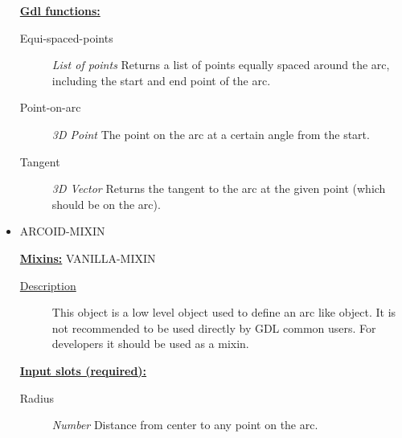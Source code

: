 \documentclass [11pt]{book}
\begin{document}
\begin{itemize}
\textbf{
\underline{Gdl functions:}}

\begin{description}

\item [Equi-spaced-points]
\emph{List of points} Returns a list of points equally spaced around the arc, including
the start and end point of the arc.


\item [Point-on-arc]
\emph{3D Point} The point on the arc at a certain angle from the start.


\item [Tangent]
\emph{3D Vector} Returns the tangent to the arc at the given point (which should be on the arc).


\end{description}







\item {}ARCOID-MIXIN


\textbf{
\underline{Mixins:}} VANILLA-MIXIN





\begin{description}

\item [
\underline{Description}]


This object is a low level object used to define 
an arc like object. It is not recommended to be used directly by GDL common users. 
For developers it should be used as a mixin.



\end{description}








\textbf{
\underline{Input slots (required):}}

\begin{description}

\item [Radius]
\emph{Number} Distance from center to any point on the arc.


\end{description}







\end{itemize}
\end{document}
